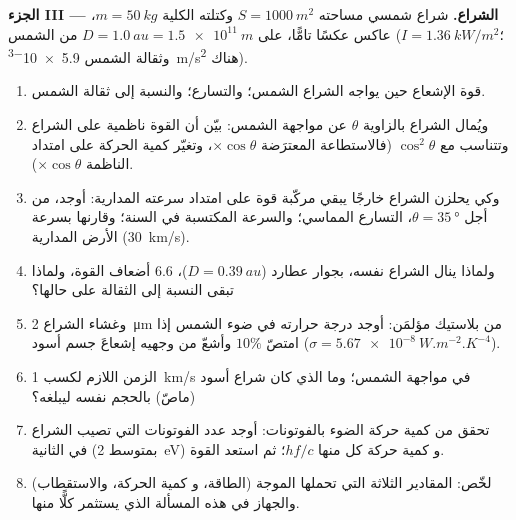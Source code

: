 \begin{problem}
\medskip
\noindent\textbf{الجزء III --- الشراع.}
شراع شمسي مساحته $S = \qty{1000}{m^2}$ وكتلته الكلية $m = \qty{50}{kg}$،
عاكس عكسًا تامًّا، على $D = \qty{1.0}{au} = \qty{1.5e11}{m}$ من الشمس
($I = \qty{1.36}{kW/m^2}$؛ وثقالة الشمس \qty{5.9e-3}{m/s^2} هناك).
\begin{enumerate}[resume]
  \item قوة الإشعاع حين يواجه الشراع الشمس؛ والتسارع؛
        والنسبة إلى ثقالة الشمس.
  \item ويُمال الشراع بالزاوية $\theta$ عن مواجهة الشمس: بيّن أن
        القوة ناظمية على الشراع وتتناسب مع $\cos^2\theta$
        (فالاستطاعة المعترَضة $\times\cos\theta$، وتغيّر كمية الحركة على امتداد
        الناظمة $\times\cos\theta$).
  \item وكي يحلزن الشراع خارجًا يبقي مركّبة قوة على امتداد
        سرعته المدارية: أوجد، من أجل $\theta = \qty{35}{\degree}$، التسارع
        المماسي؛ والسرعة المكتسبة في السنة؛ وقارنها بسرعة الأرض
        المدارية (\qty{30}{km/s}).
  \item ولماذا ينال الشراع نفسه، بجوار عطارد ($D = \qty{0.39}{au}$)،
        $6.6$ أضعاف القوة، ولماذا تبقى النسبة إلى الثقالة
        على حالها؟
  \item وغشاء الشراع \qty{2}{\micro m} من بلاستيك مؤلمَن: أوجد
        درجة حرارته في ضوء الشمس إذا امتصّ $10\%$ وأشعّ من
        وجهيه إشعاعَ جسم أسود ($\sigma = \qty{5.67e-8}{W.m^{-2}.K^{-4}}$).
  \item الزمن اللازم لكسب \qty{1}{km/s} في مواجهة الشمس؛ وما الذي كان
        شراع أسود (ماصّ) بالحجم نفسه ليبلغه؟
  \item تحقق من كمية حركة الضوء بالفوتونات: أوجد عدد الفوتونات
        التي تصيب الشراع في الثانية (بمتوسط \qty{2}{eV}) و
        كمية حركة كل منها $hf/c$؛ ثم استعد القوة.
  \item لخّص: المقادير الثلاثة التي تحملها الموجة (الطاقة، و
        كمية الحركة، والاستقطاب) والجهاز في هذه المسألة الذي
        يستثمر كلًّا منها.
\end{enumerate}
\end{problem}
